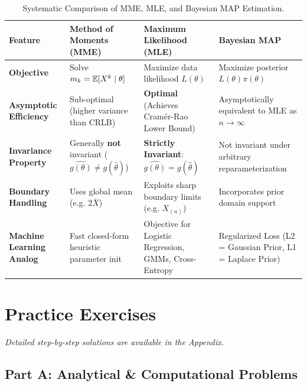 \begin{table}[htbp]
\centering
\small
\begin{tabular}{p{3.2cm}p{3.8cm}p{3.8cm}p{3.5cm}}
\toprule
\textbf{Feature} & \textbf{Method of Moments (MME)} & \textbf{Maximum Likelihood (MLE)} & \textbf{Bayesian MAP} \\
\midrule
\textbf{Objective} & Solve $m_k = \mathbb{E}[X^k \mid \theta]$ & Maximize data likelihood $L(\theta)$ & Maximize posterior $L(\theta) \pi(\theta)$ \\
\addlinespace
\textbf{Asymptotic Efficiency} & Sub-optimal (higher variance than CRLB) & \textbf{Optimal} (Achieves Cramér-Rao Lower Bound) & Asymptotically equivalent to MLE as $n \to \infty$ \\
\addlinespace
\textbf{Invariance Property} & Generally \textbf{not} invariant ($\widehat{g(\theta)} \neq g(\hat{\theta})$) & \textbf{Strictly Invariant}: $\widehat{g(\theta)} = g(\hat{\theta})$ & Not invariant under arbitrary reparameterization \\
\addlinespace
\textbf{Boundary Handling} & Uses global mean (e.g. $2\bar{X}$) & Exploits sharp boundary limits (e.g. $X_{(n)}$) & Incorporates prior domain support \\
\addlinespace
\textbf{Machine Learning Analog} & Fast closed-form heuristic parameter init & Objective for Logistic Regression, GMMs, Cross-Entropy & Regularized Loss (L2 = Gaussian Prior, L1 = Laplace Prior) \\
\bottomrule
\end{tabular}
\caption{Systematic Comparison of MME, MLE, and Bayesian MAP Estimation.}
\end{table}

\newpage
\section{Practice Exercises}
\textit{Detailed step-by-step solutions are available in the Appendix.}

\subsection*{Part A: Analytical \& Computational Problems}

